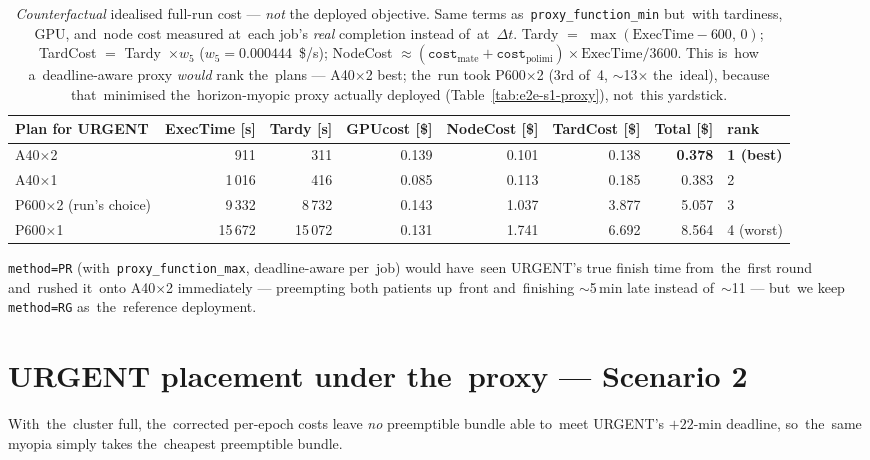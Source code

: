\begin{table}[H]\centering\scriptsize
\begin{tabularx}{\textwidth}{@{}X r r r r r r X@{}}\toprule
Plan for URGENT             & ExecTime [s] & Tardy [s] & GPUcost [\$] & NodeCost [\$] & TardCost [\$] & \textbf{Total [\$]} & rank \\\midrule
A40$\times$2  & 911 & 311    & 0.139 & 0.101 & 0.138 & \textbf{0.378}  & \textbf{1 (best)} \\
A40$\times$1  & 1\,016 & 416    & 0.085 & 0.113 & 0.185 & 0.383           & 2 \\
P600$\times$2 (run's choice) & 9\,332 & 8\,732 & 0.143 & 1.037 & 3.877 & 5.057 & 3 \\
P600$\times$1 & 15\,672 & 15\,072 & 0.131 & 1.741 & 6.692 & 8.564 & 4 (worst) \\\bottomrule
\end{tabularx}
\caption{\emph{Counterfactual} idealised full-run cost --- \emph{not} the
deployed objective.  Same terms as~\texttt{proxy\_function\_min} but~with
tardiness, GPU, and~node cost measured at~each job's \emph{real}
completion instead of~at~$\Delta t$.  Tardy $=$ $\max(\text{ExecTime}-600,
\,0)$; TardCost $=$ Tardy~$\times w_5$ ($w_5{=}0.000444$~\$/s); NodeCost
$\approx(\texttt{cost}_{\text{mate}}{+}\texttt{cost}_{\text{polimi}})\times
\text{ExecTime}/3600$.  This is~how a~deadline-aware proxy \emph{would}
rank the~plans --- A40$\times$2 best; the~run took P600$\times$2 (3rd
of~4, $\sim$13$\times$ the~ideal), because that~minimised the~horizon-myopic
proxy actually deployed (Table~\ref{tab:e2e-s1-proxy}), not~this
yardstick.}\label{tab:e2e-s1-urgent}
\end{table}

\texttt{method=PR} (with~\texttt{proxy\_function\_max}, deadline-aware
per~job) would have~seen URGENT's true finish time from~the~first round
and~rushed it~onto A40$\times$2 immediately --- preempting both patients
up~front and~finishing $\sim$5\,min late instead of~$\sim$11 --- but~we
keep \texttt{method=RG} as~the~reference deployment.

\section{URGENT placement under the~proxy --- Scenario 2}
\label{sec:e2e-s2-urgent}

With~the~cluster full, the~corrected per-epoch costs leave \emph{no}
preemptible bundle able to~meet URGENT's $+22$-min deadline, so~the~same
myopia simply takes the~cheapest preemptible bundle.

